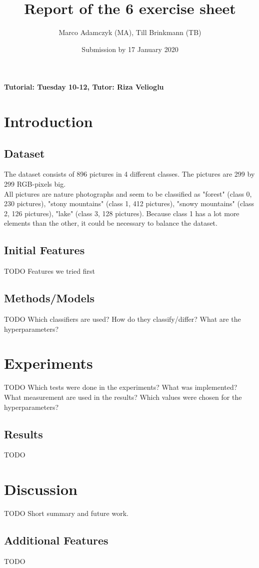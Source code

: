 \documentclass[a4paper,12pt]{article}
\title{Report of the 6\ts{th} exercise sheet}
\author{Marco Adamczyk (MA), Till Brinkmann (TB)}
\date{Submission by 17\ts{th} January 2020}
\newcommand{\initials}[1]{\marginpar{\quad\texttt{#1}}}
\begin{document}

\pagestyle{myheadings}
    
\maketitle

\begin{center}
    \textbf{Tutorial: Tuesday 10-12, Tutor: Riza Velioglu}
\end{center}

\section{Introduction}
\subsection{Dataset}
The dataset consists of 896 pictures in 4 different classes. The pictures are 299 by 299 RGB-pixels big.\\
All pictures are nature photographs and seem to be classified as 
"forest" (class 0, 230 pictures), "stony mountains" (class 1, 412 pictures), "snowy mountains" (class 2, 126 pictures), "lake" (class 3, 128 pictures).
Because class 1 has a lot more elements than the other, it could be necessary to balance the dataset. 
\initials{}
\subsection{Initial Features}
TODO Features we tried first
\initials{}
\subsection{Methods/Models}
TODO Which classifiers are used? How do they classify/differ? What are the hyperparameters?
\initials{}

\section{Experiments}
TODO Which tests were done in the experiments? What was implemented? What measurement are used in the results?
Which values were chosen for the hyperparameters?
\initials{}
\subsection{Results}
TODO
\initials{}

\section{Discussion}
TODO Short summary and future work.
\initials{}
\subsection{Additional Features}
TODO
\initials{}
\end{document}
